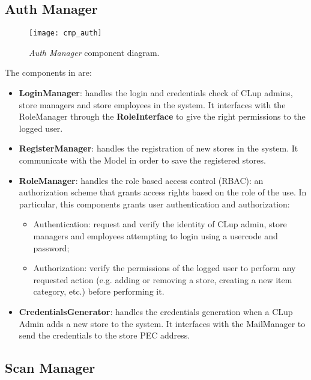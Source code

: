 \subsection{Auth Manager}

\begin{figure}[H]
	\centering
	\texttt{[image: cmp\_auth]}
	\caption{\textit{Auth Manager} component diagram.}
	\label{fig:cmp_auth}
\end{figure}

The components in  are:
\begin{itemize}
	\item \textbf{LoginManager}: handles the login and credentials check of CLup admins, store managers and store employees in the system. It interfaces with the RoleManager through the \textbf{RoleInterface} to give the right permissions to the logged user.
	
	\item \textbf{RegisterManager}: handles the registration of new stores in the system. It communicate with the Model in order to save the registered stores.
	
	\item \textbf{RoleManager}: handles the role based access control (RBAC): an authorization scheme that grants access rights based on the role of the use. In particular, this components grants user authentication and authorization:
	\begin{itemize}
		\item Authentication: request and verify the identity of CLup admin, store managers and employees attempting to login using a usercode and password;
		\item Authorization: verify the permissions of the logged user to perform any requested action (e.g. adding or removing a store, creating a new item category, etc.) before performing it.
	\end{itemize}
		
	\item \textbf{CredentialsGenerator}: handles the credentials generation when a CLup Admin adds a new store to the system. It interfaces with the MailManager to send the credentials to the store PEC address.
\end{itemize}


\subsection{Scan Manager}

